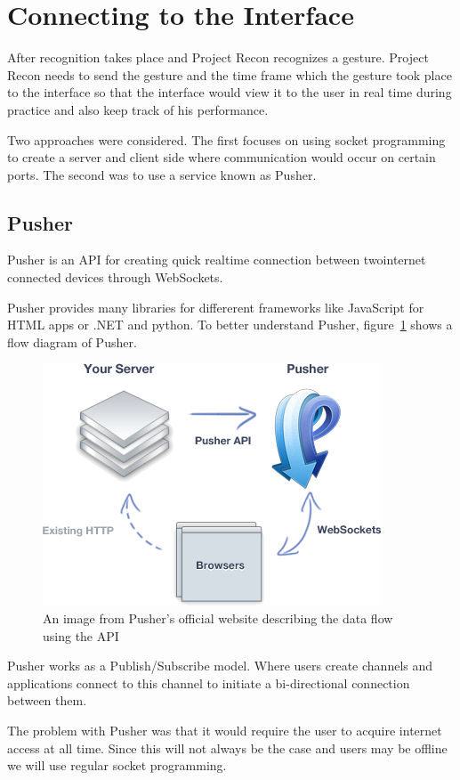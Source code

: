 \section{Connecting to the Interface}
After recognition takes place and Project Recon recognizes a gesture. Project Recon needs to send the gesture and the time frame which the gesture took place to the interface so that the interface would view it to the user in real time during practice and also keep track of his performance.

Two approaches were considered. The first focuses on using socket programming to create a server and client side where communication would occur on certain ports. The second was to use a service known as Pusher.
\subsection{Pusher \cite{citeKey4}}
Pusher is an API for creating quick realtime connection between twointernet connected devices through WebSockets.

Pusher provides many libraries for differerent frameworks like JavaScript for HTML apps or .NET and python. To better understand Pusher, figure~\ref{pusher} shows a flow diagram of Pusher.

\begin{figure}[!htbp]
\centering
\includegraphics{images/pusher.png}
\caption{An image from Pusher's official website describing the data flow using the API}
\label{pusher}
\end{figure}

Pusher works as a Publish/Subscribe model. Where users create channels and applications connect to this channel to initiate a bi-directional connection between them.

The problem with Pusher was that it would require the user to acquire internet access at all time. Since this will not always be the case and users may be offline we will use regular socket programming.
